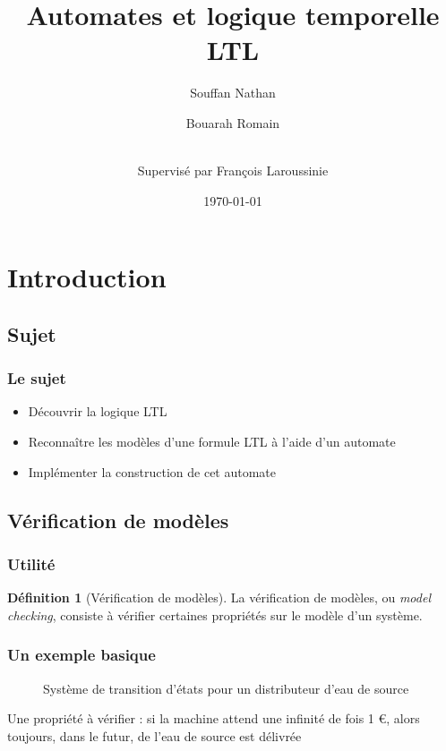 \documentclass{beamer}
\title {Automates et logique temporelle LTL}
\author{
  Souffan Nathan \and
  Bouarah Romain \and
  \\Supervisé par François Laroussinie
}
\date{\today}
\theoremstyle{plain}
\theoremstyle{definition}
\newtheorem{defi}{Définition}
\begin{document}
\begin{frame}[plain]
  \titlepage
\end{frame}


\section{Introduction}
\subsection{Sujet}
\begin{frame}
  \frametitle{Le sujet}

  \begin{itemize}
  \item Découvrir la logique LTL
  \item Reconnaître les modèles d'une formule LTL à l'aide d'un automate
  \item Implémenter la construction de cet automate
  \end{itemize}
\end{frame}


\subsection{Vérification de modèles}
\begin{frame}
  \frametitle{Utilité}

  \begin{defi}[Vérification de modèles]
    La vérification de modèles, ou \textit{model checking}, consiste à vérifier certaines propriétés sur le modèle d'un système.
  \end{defi}
\end{frame}


\begin{frame}
  \frametitle{Un exemple basique}
  
  \begin{figure}
    \centering
    \caption{Système de transition d'états pour un distributeur d'eau de source}
  \end{figure}

  Une propriété à vérifier : si la machine attend une infinité de fois 1 \euro{}, alors toujours, dans le futur, de l'eau de source est délivrée
\end{frame}
\end{document}
